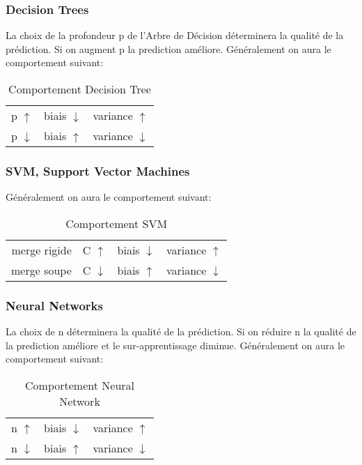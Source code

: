 \documentclass{article}
\begin{document}
\subsubsection{Decision Trees}
La choix de la profondeur p de l'Arbre de Décision déterminera la qualité de la prédiction. Si on augment p la prediction améliore. Généralement on aura le comportement suivant:
\begin{table}[H]
    \centering\begin{tabular}{lll}
        p $\uparrow$   & biais $\downarrow$ & variance $\uparrow$\\
        p $\downarrow$ & biais $\uparrow  $ & variance $\downarrow$\\
    \end{tabular}
    \caption{Comportement Decision Tree}
\end{table}

\subsubsection{SVM, Support Vector Machines}
Généralement on aura le comportement suivant:
\begin{table}[H]
    \centering\begin{tabular}{rlll}
        merge rigide & C $\uparrow$   & biais $\downarrow$ & variance $\uparrow$\\
        merge soupe  & C $\downarrow$ & biais $\uparrow  $ & variance $\downarrow$\\
    \end{tabular}
    \caption{Comportement SVM}
\end{table}

\subsubsection{Neural Networks}
La choix de n déterminera la qualité de la prédiction. Si on réduire n la qualité de la prediction améliore et le sur-apprentissage diminue. Généralement on aura le comportement suivant:
\begin{table}[H]
    \centering\begin{tabular}{lll}
        n $\uparrow$   & biais $\downarrow$ & variance $\uparrow$\\
        n $\downarrow$ & biais $\uparrow  $ & variance $\downarrow$\\
    \end{tabular}
    \caption{Comportement Neural Network}
\end{table}
\end{document}
